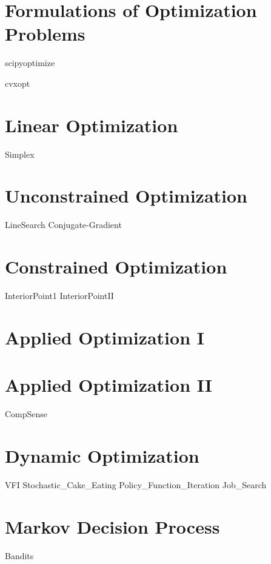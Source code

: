 \documentclass[nociteref]{SIAM-GH-book}
\begin{document}
\part{Formulations of Optimization Problems}
{scipyoptimize}

{cvxopt}

\part{Linear Optimization}
{Simplex}


\part{Unconstrained Optimization}
{LineSearch}
{Conjugate-Gradient}

\part{Constrained Optimization}
{InteriorPoint1}
{InteriorPointII}

\part{Applied Optimization I}

\part{Applied Optimization II}
{CompSense}

\part{Dynamic Optimization}
{VFI}
{Stochastic_Cake_Eating}
{Policy_Function_Iteration}
{Job_Search}

\part{Markov Decision Process}
{Bandits}
\end{document}
